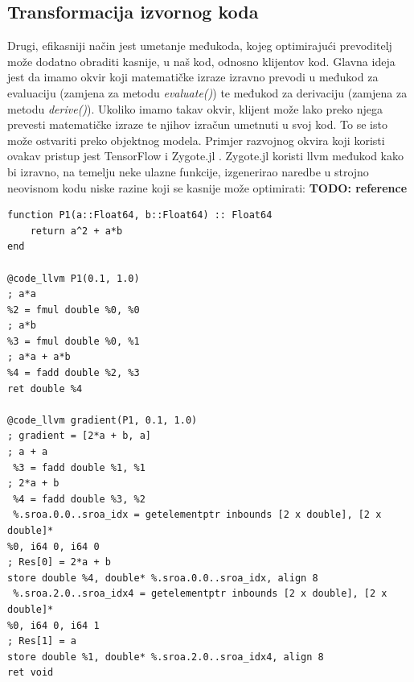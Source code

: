 \documentclass[zavrsnirad]{fer}
\begin{document}
\subsection{Transformacija izvornog koda}

Drugi, efikasniji način jest umetanje međukoda, kojeg optimirajući prevoditelj može dodatno obraditi kasnije, u naš kod, odnosno klijentov kod. Glavna ideja jest da imamo okvir koji matematičke izraze izravno prevodi u međukod za evaluaciju (zamjena za metodu \textit{evaluate()}) te međukod za derivaciju (zamjena za metodu \textit{derive()}). Ukoliko imamo takav okvir, klijent može lako preko njega prevesti matematičke izraze te njihov izračun umetnuti u svoj kod. To se isto može ostvariti preko objektnog modela. Primjer razvojnog okvira koji koristi ovakav pristup jest TensorFlow i Zygote.jl \cite{prague:diffcpp}. Zygote.jl koristi llvm međukod kako bi izravno, na temelju neke ulazne funkcije, izgenerirao naredbe u strojno neovisnom kodu niske razine koji se kasnije može optimirati:
\textbf{TODO: reference}
\\

\begin{lstlisting}[caption={Primjer korištenja Zygote.jl za generiranje llvm međukoda za funkciju: $a^2 + a*b$ \cite{prague:diffcpp}}]
function P1(a::Float64, b::Float64) :: Float64 
    return a^2 + a*b 
end

@code_llvm P1(0.1, 1.0) 
; a*a 
%2 = fmul double %0, %0 
; a*b 
%3 = fmul double %0, %1 
; a*a + a*b 
%4 = fadd double %2, %3 
ret double %4 
 
@code_llvm gradient(P1, 0.1, 1.0) 
; gradient = [2*a + b, a] 
; a + a 
 %3 = fadd double %1, %1 
; 2*a + b 
 %4 = fadd double %3, %2 
 %.sroa.0.0..sroa_idx = getelementptr inbounds [2 x double], [2 x double]* 
%0, i64 0, i64 0 
; Res[0] = 2*a + b 
store double %4, double* %.sroa.0.0..sroa_idx, align 8 
 %.sroa.2.0..sroa_idx4 = getelementptr inbounds [2 x double], [2 x double]* 
%0, i64 0, i64 1 
; Res[1] = a  
store double %1, double* %.sroa.2.0..sroa_idx4, align 8 
ret void
\end{lstlisting}

\pagebreak
\end{document}

